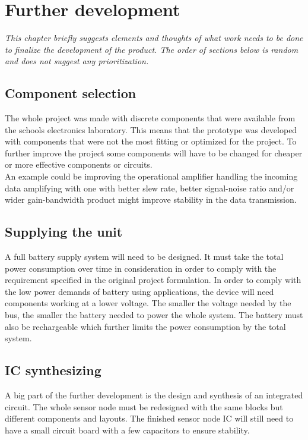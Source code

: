 \chapter{Further development}
\textit{This chapter briefly suggests elements and thoughts of what work needs to be done to finalize the development of the product. The order of sections below is random and does not suggest any prioritization.}

\section{Component selection}
The whole project was made with discrete components that were available from the schools electronics laboratory. This means that the prototype was developed with components that were not the most fitting or optimized for the project. To further improve the project some components will have to be changed for cheaper or more effective components or circuits. \\
An example could be improving the operational amplifier handling the incoming data amplifying with one with better slew rate, better signal-noise ratio and/or wider gain-bandwidth product might improve stability in the data transmission.

\section{Supplying the unit}
A full battery supply system will need to be designed. It must take the total power consumption over time in consideration in order to comply with the requirement specified in the original project formulation. In order to comply with the low power demands of battery using applications, the device will need components working at a lower voltage. The smaller the voltage needed by the bus, the smaller the battery needed to power the whole system. The battery must also be rechargeable which further limits the power consumption by the total system.

\section{IC synthesizing}
A big part of the further development is the design and synthesis of an integrated circuit. The whole sensor node must be redesigned with the same blocks but different components and layouts. The finished sensor node IC will still need to have a small circuit board with a few capacitors to ensure stability.

